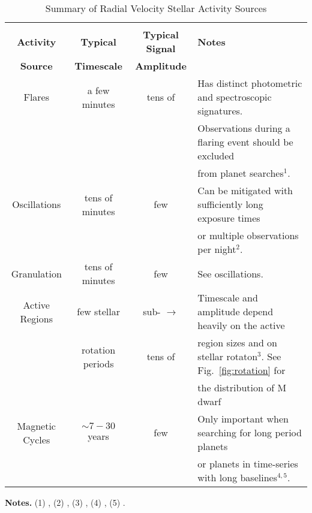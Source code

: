 \begin{table*}
\small
\renewcommand{\arraystretch}{0.7}
\caption{Summary of Radial Velocity Stellar Activity Sources}
\label{table:activity}
\begin{tabular}{cccl}
  \hline \\ [-1ex]
  \textbf{Activity} & \textbf{Typical} & \textbf{Typical Signal} & \textbf{Notes} \\
  \textbf{Source} & \textbf{Timescale} & \textbf{Amplitude} & \\
  \hline
  Flares & a few minutes & tens of \mps{} & Has distinct photometric and spectroscopic signatures. \\ 
  &&&Observations during a flaring event should be excluded \\
  &&& from planet searches$^1$. \\
  \hline
  Oscillations & tens of minutes & few \mps{} & Can be mitigated with sufficiently long exposure times \\
  &&&or multiple observations per night$^2$. \\
  \hline
  Granulation & tens of minutes & few \mps{} & See oscillations.  \\
  \hline
  Active Regions & few stellar & sub-\mps{} $\to$ & Timescale and amplitude depend heavily on the active \\
  & rotation periods & tens of \mps{} & region sizes and on stellar rotaton$^3$. See Fig.~\ref{fig:rotation} for \\
  &&& the distribution of M dwarf \prot{.} \\
  \hline
  Magnetic Cycles & $\sim  7-30$ years & few \mps{} & Only important when searching for long period planets \\
  &&& or planets in time-series with long baselines$^{4,5}$.
  \end{tabular}
\begin{list}{}{}
\item {\bf{Notes.}}
      (1) \cite{reiners09}, (2) \cite{dumusque11a}, (3) \cite{dumusque11b}, (4) \cite{santos10},
      (5) \cite{robertson14}. \\
\end{list}
\end{table*}
